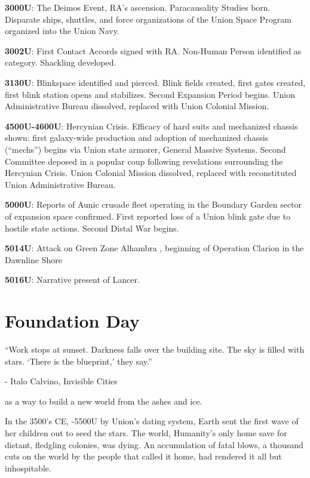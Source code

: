 \textbf{3000U}: The Deimos Event, RA’s ascension. Paracausality Studies born. Disparate ships, shuttles,
and force organizations of the Union Space Program organized into the Union Navy.

\textbf{3002U}: First Contact Accords signed with RA. Non-Human Person identified as category.
Shackling developed.

\textbf{3130U}: Blinkspace identified and pierced. Blink fields created, first gates created, first blink
station opens and stabilizes. Second Expansion Period begins. Union Administrative Bureau
dissolved, replaced with Union Colonial Mission.

\textbf{4500U-4600U}: Hercynian Crisis. Efficacy of hard suits and mechanized chassis shown: first
galaxy-wide production and adoption of mechanized chassis (“mechs”) begins via Union state
armorer, General Massive Systems. Second Committee deposed in a popular coup following
revelations surrounding the Hercynian Crisis. Union Colonial Mission dissolved, replaced with
reconstituted Union Administrative Bureau.

\textbf{5000U}: Reports of Aunic crusade fleet operating in the Boundary Garden sector of expansion
space confirmed. First reported loss of a Union blink gate due to hostile state actions. Second
Distal War begins.

\textbf{5014U}: Attack on Green Zone Alhambra , beginning of Operation Clarion in the Dawnline Shore

\textbf{5016U}: Narrative present of Lancer.

\section{Foundation Day}

\begin{epiQuote}
    ``Work stops at sunset. Darkness falls over the building site. The sky is filled with stars.
    `There is the blueprint,' they say.''

    
    \quad - Italo Calvino, \textnormal{Invisible Cities}
\end{epiQuote}

 as a way to build a new world from the ashes and ice.

In the 3500’s CE, -5500U by Union’s dating system, Earth sent the first wave of her children out
to seed the stars. The world, Humanity’s only home save for distant, fledgling colonies, was
dying. An accumulation of fatal blows, a thousand cuts on the world by the people that called it
home, had rendered it all but inhospitable.


